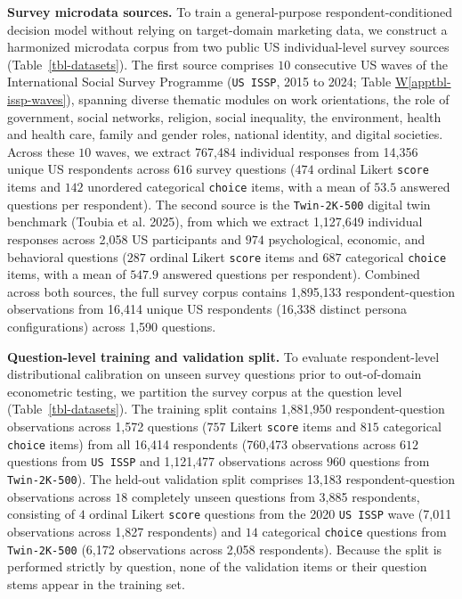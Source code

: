 \documentclass[
  letterpaper,
  DIV=11,
  numbers=noendperiod]{scrartcl}
\newcounter{none} %
\newcommand*\quartoapptblref[1]{Table \hyperref[#1]{W\ref{#1}}}
\begin{document}
\textbf{Survey microdata sources.} To train a general-purpose
respondent-conditioned decision model without relying on target-domain
marketing data, we construct a harmonized microdata corpus from two
public US individual-level survey sources (Table~\ref{tbl-datasets}).
The first source comprises \(10\) consecutive US waves of the
International Social Survey Programme (\texttt{US\ ISSP}, 2015 to 2024;
\quartoapptblref{apptbl-issp-waves}), spanning diverse thematic modules
on work orientations, the role of government, social networks, religion,
social inequality, the environment, health and health care, family and
gender roles, national identity, and digital societies. Across these
\(10\) waves, we extract 767,484 individual responses from 14,356 unique
US respondents across \(616\) survey questions (\(474\) ordinal Likert
\texttt{score} items and \(142\) unordered categorical \texttt{choice}
items, with a mean of \(53.5\) answered questions per respondent). The
second source is the \texttt{Twin-2K-500} digital twin benchmark (Toubia
et al. 2025), from which we extract 1,127,649 individual responses
across 2,058 US participants and \(974\) psychological, economic, and
behavioral questions (\(287\) ordinal Likert \texttt{score} items and
\(687\) categorical \texttt{choice} items, with a mean of \(547.9\)
answered questions per respondent). Combined across both sources, the
full survey corpus contains 1,895,133 respondent-question observations
from 16,414 unique US respondents (16,338 distinct persona
configurations) across 1,590 questions.

\textbf{Question-level training and validation split.} To evaluate
respondent-level distributional calibration on unseen survey questions
prior to out-of-domain econometric testing, we partition the survey
corpus at the question level (Table~\ref{tbl-datasets}). The training
split contains 1,881,950 respondent-question observations across 1,572
questions (\(757\) Likert \texttt{score} items and \(815\) categorical
\texttt{choice} items) from all 16,414 respondents (760,473 observations
across \(612\) questions from \texttt{US\ ISSP} and 1,121,477
observations across \(960\) questions from \texttt{Twin-2K-500}). The
held-out validation split comprises 13,183 respondent-question
observations across \(18\) completely unseen questions from 3,885
respondents, consisting of \(4\) ordinal Likert \texttt{score} questions
from the 2020 \texttt{US\ ISSP} wave (7,011 observations across 1,827
respondents) and \(14\) categorical \texttt{choice} questions from
\texttt{Twin-2K-500} (6,172 observations across 2,058 respondents).
Because the split is performed strictly by question, none of the
validation items or their question stems appear in the training set.
\end{document}

